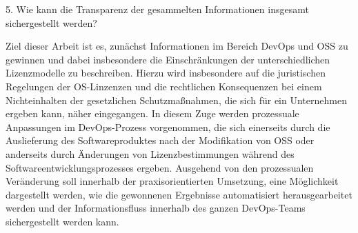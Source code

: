 

5. Wie kann die Transparenz der gesammelten Informationen insgesamt sichergestellt werden? 


Ziel dieser Arbeit ist es, zunächst Informationen im Bereich DevOps und OSS zu gewinnen und dabei insbesondere die Einschränkungen der unterschiedlichen Lizenzmodelle zu beschreiben. Hierzu wird insbesondere auf die juristischen Regelungen der OS-Linzenzen und die rechtlichen Konsequenzen bei einem Nichteinhalten der gesetzlichen Schutzmaßnahmen, die sich für ein Unternehmen ergeben kann, näher eingegangen. In diesem Zuge werden prozessuale Anpassungen im DevOps-Prozess vorgenommen, die sich einerseits durch die Auslieferung des Softwareproduktes nach der Modifikation von OSS oder anderseits durch Änderungen von Lizenzbestimmungen während des Softwareentwicklungsprozesses ergeben. Ausgehend von den prozessualen Veränderung soll innerhalb der praxisorientierten Umsetzung, eine Möglichkeit dargestellt werden, wie die gewonnenen Ergebnisse automatisiert herausgearbeitet werden und der Informationsfluss innerhalb des ganzen DevOps-Teams sichergestellt werden kann.
 
